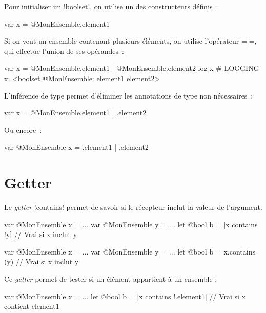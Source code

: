 Pour initialiser un \ggsq!boolset!, on utilise un des constructeurs définis~:
\begin{galgas34}
var x = @MonEnsemble.element1
\end{galgas34}

Si on veut un ensemble contenant plusieurs éléments, on utilise l'opérateur \ggsq=|=, qui effectue l'union de ses opérandes~:
\begin{galgas34}
var x = @MonEnsemble.element1 | @MonEnsemble.element2
log x # LOGGING x: <boolset @MonEnsemble: element1 element2>
\end{galgas34}

L'inférence de type permet d'éliminer les annotations de type non nécessaires~:
\begin{galgas34}
var x = @MonEnsemble.element1 | .element2
\end{galgas34}

Ou encore~:
\begin{galgas34}
var @MonEnsemble x = .element1 | .element2
\end{galgas34}





















\section{Getter}


Le \emph{getter} \ggsq!contains! permet de savoir si le récepteur inclut la valeur de l'argument.


\begin{galgas3}
var @MonEnsemble x = ...
var @MonEnsemble y = ...
let @bool b = [x contains !y] // Vrai si x inclut y
\end{galgas3}

\begin{galgas4}
var @MonEnsemble x = ...
var @MonEnsemble y = ...
let @bool b = x.contains (y) // Vrai si x inclut y
\end{galgas4}

Ce \emph{getter} permet de tester si un élément appartient à un ensemble :
\begin{galgas3}
var @MonEnsemble x = ...
let @bool b = [x contains !.element1] // Vrai si x contient element1
\end{galgas3}


